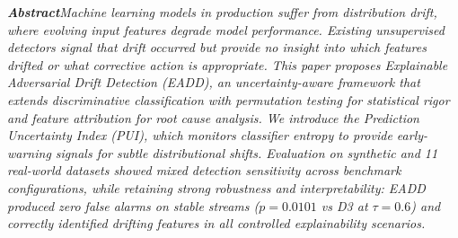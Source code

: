 \documentclass[10pt,twocolumn,a4paper]{article}
\begin{document}

\noindent\textbf{\textit{Abstract}}\textemdash\textit{Machine learning models in production suffer from distribution drift, where evolving input features degrade model performance. Existing unsupervised detectors signal that drift occurred but provide no insight into which features drifted or what corrective action is appropriate. This paper proposes Explainable Adversarial Drift Detection (EADD), an uncertainty-aware framework that extends discriminative classification with permutation testing for statistical rigor and feature attribution for root cause analysis. We introduce the Prediction Uncertainty Index (PUI), which monitors classifier entropy to provide early-warning signals for subtle distributional shifts. Evaluation on synthetic and 11 real-world datasets showed mixed detection sensitivity across benchmark configurations, while retaining strong robustness and interpretability: EADD produced zero false alarms on stable streams ($p=0.0101$ vs D3 at $\tau=0.6$) and correctly identified drifting features in all controlled explainability scenarios.}
\end{document}
